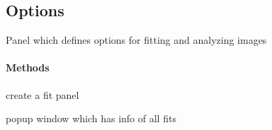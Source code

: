 \documentclass[letterpaper,10pt,english]{sphinxmanual}
\begin{document}
\subsection{Options}
\label{Options::doc}\label{Options:options}

\begin{fulllineitems}
\label{Options:Optionswidgets.Options}
Panel which defines options for fitting and analyzing images
\paragraph{Methods}

\begin{fulllineitems}
\label{Options:Optionswidgets.Options.create_fit_panel}
create a fit panel

\end{fulllineitems}


\begin{fulllineitems}
\label{Options:Optionswidgets.Options.fit_name}
\end{fulllineitems}


\begin{fulllineitems}
\label{Options:Optionswidgets.Options.get_fit_info}
popup window which has info of all fits

\end{fulllineitems}


\begin{fulllineitems}
\label{Options:Optionswidgets.Options.make_key}
\end{fulllineitems}


\begin{fulllineitems}
\label{Options:Optionswidgets.Options.message}
\end{fulllineitems}


\end{fulllineitems}
\end{document}
